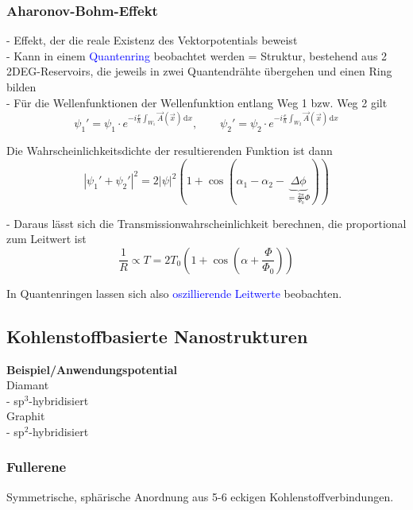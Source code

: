 \documentclass{article}
\newcommand{\diff}{\mathrm{d}}
\newcommand{\lr}[1]{\left(#1\right)}
\begin{document}
\subsubsection{Aharonov-Bohm-Effekt}
- Effekt, der die reale Existenz des Vektorpotentials beweist\\
- Kann in einem \textcolor{blue}{Quantenring} beobachtet werden = Struktur, bestehend aus 2 2DEG-Reservoirs, die jeweils in zwei Quantendrähte übergehen und einen Ring bilden\\
- Für die Wellenfunktionen der Wellenfunktion entlang Weg 1 bzw. Weg 2 gilt
	\begin{equation}
		\psi_1' = \psi_1 \cdot e^{-i\frac{e}{\hbar}\int_{W_1} \vec{A}(\vec{x})\,\diff x}, \qquad
		\psi_2' = \psi_2 \cdot e^{-i\frac{e}{\hbar}\int_{W_2} \vec{A}(\vec{x})\,\diff x}
	\end{equation}

Die Wahrscheinlichkeitsdichte der resultierenden Funktion ist dann
	\begin{equation}
		|\psi_1' + \psi_2'|^2 = 2|\psi|^2 ( 1 + \cos(\alpha_1 - \alpha_2 - \underbrace{\Delta\phi}_{=\frac{2\pi}{\Phi_0}\Phi}) )
	\end{equation}

- Daraus lässt sich die Transmissionwahrscheinlichkeit berechnen, die proportional zum Leitwert ist
	\begin{equation}
		\frac{1}{R} \propto T = 2T_0 \lr{ 1 + \cos(\alpha + \frac{\Phi}{\Phi_0}) }
	\end{equation}

In Quantenringen lassen sich also \textcolor{blue}{oszillierende Leitwerte} beobachten.







\subsection{Kohlenstoffbasierte Nanostrukturen}
\textbf{Beispiel/Anwendungspotential}\\
Diamant\\
- sp$^3$-hybridisiert\\
Graphit\\
- sp$^2$-hybridisiert


\subsubsection{Fullerene}
Symmetrische, sphärische Anordnung aus 5-6 eckigen Kohlenstoffverbindungen.
\end{document}
